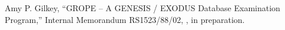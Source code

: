 Amy P. Gilkey,
``GROPE -- A GENESIS / EXODUS Database Examination Program,''
Internal Memorandum RS1523/88/02, \SNL, in preparation.
